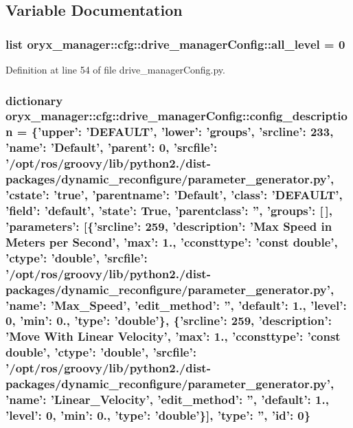 \subsection{\-Variable \-Documentation}
\subsubsection[{all\-\_\-level}]{\setlength{\rightskip}{0pt plus 5cm}list {\bf oryx\-\_\-manager\-::cfg\-::drive\-\_\-manager\-Config\-::all\-\_\-level} = 0}\label{namespaceoryx__manager_1_1cfg_1_1drive__managerConfig_a24c09f478bba789b6b49118858964bf4}


\-Definition at line 54 of file drive\-\_\-manager\-Config.\-py.

\subsubsection[{config\-\_\-description}]{\setlength{\rightskip}{0pt plus 5cm}dictionary {\bf oryx\-\_\-manager\-::cfg\-::drive\-\_\-manager\-Config\-::config\-\_\-description} = \{'upper'\-: '\-D\-E\-F\-A\-U\-L\-T', 'lower'\-: 'groups', 'srcline'\-: 233, 'name'\-: '\-Default', 'parent'\-: 0, 'srcfile'\-: '/opt/ros/groovy/lib/python2./dist-\/packages/dynamic\-\_\-reconfigure/parameter\-\_\-generator.\-py', 'cstate'\-: 'true', 'parentname'\-: '\-Default', 'class'\-: '\-D\-E\-F\-A\-U\-L\-T', 'field'\-: '{\bf default}', 'state'\-: \-True, 'parentclass'\-: '', 'groups'\-: [$\,$], 'parameters'\-: [\{'srcline'\-: 259, 'description'\-: '\-Max \-Speed in \-Meters per \-Second', '{\bf max}'\-: 1., 'cconsttype'\-: 'const double', 'ctype'\-: 'double', 'srcfile'\-: '/opt/ros/groovy/lib/python2./dist-\/packages/dynamic\-\_\-reconfigure/parameter\-\_\-generator.\-py', 'name'\-: '\-Max\-\_\-\-Speed', 'edit\-\_\-method'\-: '', '{\bf default}'\-: 1., '{\bf level}'\-: 0, '{\bf min}'\-: 0., '{\bf type}'\-: 'double'\}, \{'srcline'\-: 259, 'description'\-: '\-Move \-With \-Linear \-Velocity', '{\bf max}'\-: 1., 'cconsttype'\-: 'const double', 'ctype'\-: 'double', 'srcfile'\-: '/opt/ros/groovy/lib/python2./dist-\/packages/dynamic\-\_\-reconfigure/parameter\-\_\-generator.\-py', 'name'\-: '\-Linear\-\_\-\-Velocity', 'edit\-\_\-method'\-: '', '{\bf default}'\-: 1., '{\bf level}'\-: 0, '{\bf min}'\-: 0., '{\bf type}'\-: 'double'\}], '{\bf type}'\-: '', 'id'\-: 0\}}\label{namespaceoryx__manager_1_1cfg_1_1drive__managerConfig_a72ad106559d3526aa1cc3f8cb5434edb}


